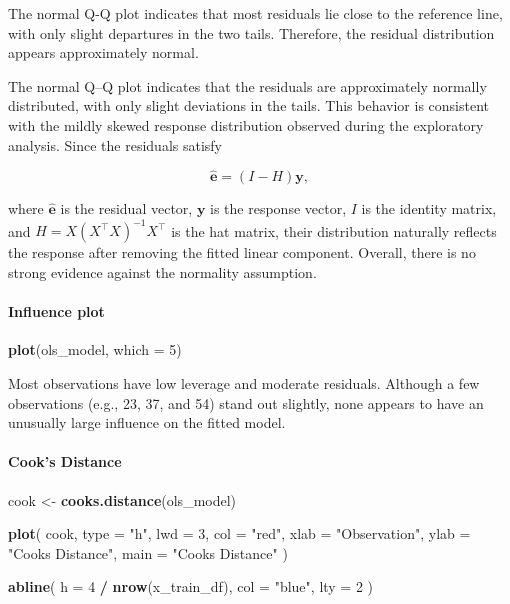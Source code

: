 \documentclass[
  11pt,
]{article}
\newenvironment{Shaded}{\begin{snugshade}}{\end{snugshade}}
\newcommand{\AttributeTok}[1]{\textcolor[rgb]{0.13,0.29,0.53}{#1}}
\newcommand{\DecValTok}[1]{\textcolor[rgb]{0.00,0.00,0.81}{#1}}
\newcommand{\FunctionTok}[1]{\textcolor[rgb]{0.13,0.29,0.53}{\textbf{#1}}}
\newcommand{\NormalTok}[1]{#1}
\newcommand{\OtherTok}[1]{\textcolor[rgb]{0.56,0.35,0.01}{#1}}
\newcommand{\SpecialCharTok}[1]{\textcolor[rgb]{0.81,0.36,0.00}{\textbf{#1}}}
\newcommand{\StringTok}[1]{\textcolor[rgb]{0.31,0.60,0.02}{#1}}
\newcounter{none} %
\begin{document}
The normal Q-Q plot indicates that most residuals lie close to the
reference line, with only slight departures in the two tails. Therefore,
the residual distribution appears approximately normal.

The normal Q--Q plot indicates that the residuals are approximately
normally distributed, with only slight deviations in the tails. This
behavior is consistent with the mildly skewed response distribution
observed during the exploratory analysis. Since the residuals satisfy

\[\hat{\mathbf e}=(I-H)\mathbf y,\]

where \(\hat{\mathbf e}\) is the residual vector, \(\mathbf y\) is the
response vector, \(I\) is the identity matrix, and
\(H=X(X^\top X)^{-1}X^\top\) is the hat matrix, their distribution
naturally reflects the response after removing the fitted linear
component. Overall, there is no strong evidence against the normality
assumption.

\paragraph{Influence plot}\label{influence-plot}

\begin{Shaded}
\begin{Highlighting}[]
\FunctionTok{plot}\NormalTok{(ols\_model, }\AttributeTok{which =} \DecValTok{5}\NormalTok{)}
\end{Highlighting}
\end{Shaded}

Most observations have low leverage and moderate residuals. Although a
few observations (e.g., 23, 37, and 54) stand out slightly, none appears
to have an unusually large influence on the fitted model.

\paragraph{Cook's Distance}\label{cooks-distance}

\begin{Shaded}
\begin{Highlighting}[]
\NormalTok{cook }\OtherTok{\textless{}{-}} \FunctionTok{cooks.distance}\NormalTok{(ols\_model)}

\FunctionTok{plot}\NormalTok{(}
\NormalTok{  cook,}
  \AttributeTok{type =} \StringTok{"h"}\NormalTok{,}
  \AttributeTok{lwd =} \DecValTok{3}\NormalTok{,}
  \AttributeTok{col =} \StringTok{"red"}\NormalTok{,}
  \AttributeTok{xlab =} \StringTok{"Observation"}\NormalTok{,}
  \AttributeTok{ylab =} \StringTok{"Cook\textquotesingle{}s Distance"}\NormalTok{,}
  \AttributeTok{main =} \StringTok{"Cook\textquotesingle{}s Distance"}
\NormalTok{)}

\FunctionTok{abline}\NormalTok{(}
  \AttributeTok{h =} \DecValTok{4} \SpecialCharTok{/} \FunctionTok{nrow}\NormalTok{(x\_train\_df),}
  \AttributeTok{col =} \StringTok{"blue"}\NormalTok{,}
  \AttributeTok{lty =} \DecValTok{2}
\NormalTok{)}
\end{Highlighting}
\end{Shaded}
\end{document}
